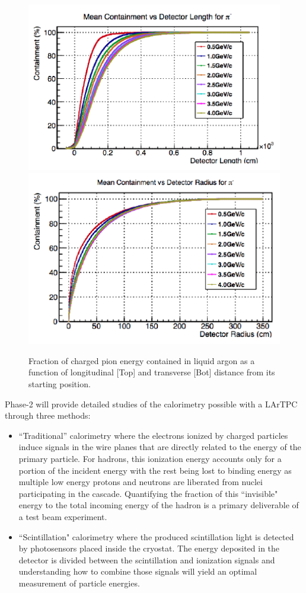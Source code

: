\documentclass[DIV=calc, paper=a4, fontsize=10pt, twocolumn]{scrartcl}	 %
\begin{document}
{%
\begin{figure}[h!]
\centering
\includegraphics[width=3.in]{Figures/pi-cont-l}
\includegraphics[width=3.in]{Figures/pi-cont-r}
\caption{\scriptsize \sf Fraction of charged pion energy contained in liquid argon as a function of longitudinal [Top] and transverse [Bot] distance from its starting position.}
\label{fig:containment}
\end{figure}
Phase-2 will provide detailed studies of the calorimetry possible with a LArTPC through three methods:
\begin{itemize}
\item  ``Traditional'' calorimetry where the electrons ionized by charged particles induce signals in the wire planes that are directly related to the energy of the primary particle. For hadrons, this ionization energy accounts only for a portion of the incident energy with the rest being lost to binding energy as multiple low energy protons and neutrons are liberated from nuclei participating in the cascade. Quantifying the fraction of this ``invisible" energy to the total incoming energy of the hadron is a primary deliverable of a test beam experiment.
\item  ``Scintillation" calorimetry where the produced scintillation light is detected by photosensors placed inside the cryostat. The energy deposited in the detector is divided between the scintillation and ionization signals and understanding how to combine those signals will yield an optimal measurement of particle energies.  

\end{itemize}}
\end{document}
